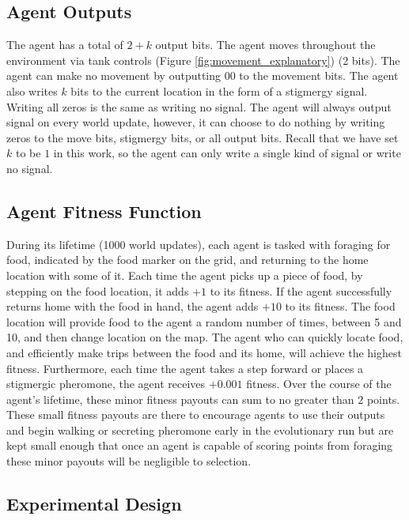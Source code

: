 

\subsection*{Agent Outputs}

The agent has a total of $2+k$ output bits. The agent moves throughout the environment via tank controls (Figure \ref{fig:movement_explanatory}) (2 bits). The agent can make no movement by outputting $00$ to the movement bits. The agent also writes $k$ bits to the current location in the form of a stigmergy signal. Writing all zeros is the same as writing no signal. The agent will always output signal on every world update, however, it can choose to do nothing by writing zeros to the move bits, stigmergy bits, or all output bits. Recall that we have set $k$ to be $1$ in this work, so the agent can only write a single kind of signal or write no signal.



\subsection*{Agent Fitness Function}

During its lifetime (1000 world updates), each agent is tasked with foraging for food, indicated by the food marker on the grid, and returning to the home location with some of it. Each time the agent picks up a piece of food, by stepping on the food location, it adds $+1$ to its fitness. If the agent successfully returns home with the food in hand, the agent adds $+10$ to its fitness. The food location will provide food to the agent a random number of times, between 5 and 10, and then change location on the map. The agent who can quickly locate food, and efficiently make trips between the food and its home, will achieve the highest fitness. Furthermore, each time the agent takes a step forward or places a stigmergic pheromone, the agent receives $+0.001$ fitness. Over the course of the agent's lifetime, these minor fitness payouts can sum to no greater than $2$ points. These small fitness payouts are there to encourage agents to use their outputs and begin walking or secreting pheromone early in the evolutionary run but are kept small enough that once an agent is capable of scoring points from foraging these minor payouts will be negligible to selection.

\subsection {Experimental Design}

